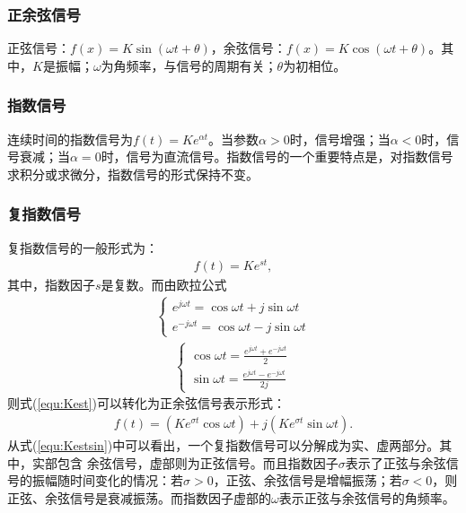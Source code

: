 \documentclass{hitreport}
\begin{document}
\subsubsection{正余弦信号}

正弦信号：$f\left(x\right) = K\sin \left(\omega t+\theta \right)$，余弦信号：$f\left(x\right) = K\cos \left(\omega t+\theta \right)$。其中，$K$是振幅；$\omega$为角频率，与信号的周期有关；$\theta$为初相位。

\subsubsection{指数信号}
连续时间的指数信号为$f\left(t\right) = Ke^{\alpha t} $。当参数$\alpha >0$时，信号增强；当$\alpha <0$时，信号衰减；当$\alpha =0$时，信号为直流信号。指数信号的一个重要特点是，对指数信号求积分或求微分，指数信号的形式保持不变。

\subsubsection{复指数信号}

复指数信号的一般形式为：
\begin{align}\label{equ:Kest}
f\left(t\right) = Ke^{st},
\end{align}
其中，指数因子$s$是复数。而由欧拉公式
\begin{align}\label{equ:ouler}
	\left\{ \begin{array}{l}
	e^{j\omega t} = \cos \omega t + j\sin \omega t\\
	e^{-j\omega t} = \cos \omega t - j\sin \omega t
	\end{array} \right.
\end{align}
\begin{align}
	\left\{ \begin{array}{l}
	\cos \omega t =\frac{e^{j\omega t}+e^{-j\omega t}}{2}\\
	\sin \omega t =\frac{e^{j\omega t}-e^{-j\omega t}}{2j}
	\end{array} \right.
\end{align}
则式(\ref{equ:Kest})可以转化为正余弦信号表示形式：
\begin{align}\label{equ:Kestsin}
f\left(t\right) = \left(Ke^{\sigma t}\cos \omega t\right) +j\left(Ke^{\sigma t}\sin \omega t\right).
\end{align}
从式(\ref{equ:Kestsin})中可以看出，一个复指数信号可以分解成为实、虚两部分。其中，实部包含
余弦信号，虚部则为正弦信号。而且指数因子$\sigma$表示了正弦与余弦信号的振幅随时间变化的情况：若$\sigma > 0$，正弦、余弦信号是增幅振荡；若$\sigma <0$，则正弦、余弦信号是衰减振荡。而指数因子虚部的$\omega$表示正弦与余弦信号的角频率。
\end{document}
